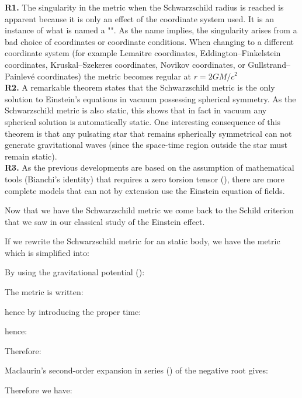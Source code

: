 	\begin{tcolorbox}[title=Remarks,colframe=black,arc=10pt]
	\textbf{R1.} The singularity in the metric when the Schwarzschild radius is reached is apparent because it is only an effect of the coordinate system used. It is an instance of what is named a "". As the name implies, the singularity arises from a bad choice of coordinates or coordinate conditions. When changing to a different coordinate system (for example Lemaitre coordinates, Eddington–Finkelstein coordinates, Kruskal–Szekeres coordinates, Novikov coordinates, or Gullstrand–Painlevé coordinates) the metric becomes regular at $r=2GM/c^2$\\
	
	\textbf{R2.} A remarkable theorem states that the Schwarzschild metric is the only solution to Einstein's equations in vacuum possessing spherical symmetry. As the Schwarzschild metric is also static, this shows that in fact in vacuum any spherical solution is automatically static. One interesting consequence of this theorem is that any pulsating star that remains spherically symmetrical can not generate gravitational waves (since the space-time region outside the star must remain static).\\
	
	\textbf{R3.} As the previous developments are based on the assumption of mathematical tools (Bianchi's identity) that requires a zero torsion tensor (), there are more complete models that can not by extension use the Einstein equation of fields.
	\end{tcolorbox}	
	Now that we have the Schwarzschild metric we come back to the Schild criterion that we saw in our classical study of the Einstein effect.

	If we rewrite the Schwarzschild metric for an static body, we have the metric which is simplified into:
	
	By using the gravitational potential ():
	
	The metric is written:
	
	hence by introducing the proper time:
	
	hence:
	
	Therefore:
	
	Maclaurin's second-order expansion in series () of the negative root gives:
	
	Therefore we have:
	
